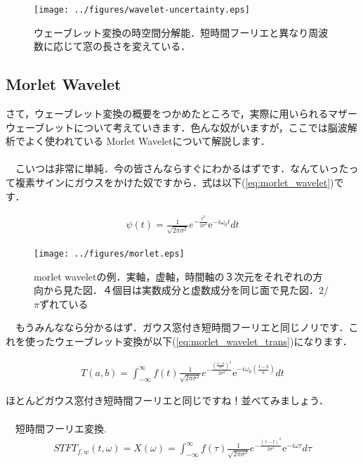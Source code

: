 \documentclass[11pt,a4paper]{ujreport} 	%
\begin{document}
\begin{figure}[H]
  \label{im:wavelet-uncertainty}
  \centering
  \texttt{[image: ../figures/wavelet-uncertainty.eps]}
  \caption{ウェーブレット変換の時空間分解能．短時間フーリエと異なり周波数に応じて窓の長さを変えている．}
\end{figure}

\subsection{Morlet Wavelet}
さて，ウェーブレット変換の概要をつかめたところで，実際に用いられるマザーウェーブレットについて考えていきます．色んな奴がいますが，ここでは脳波解析でよく使われている Morlet Waveletについて解説します．\\
\\
　こいつは非常に単純．今の皆さんならすぐにわかるはずです．なんていったって複素サインにガウスをかけた奴ですから．式は以下(\ref{eq:morlet_wavelet})です．

\begin{eqnarray}
\psi(t) = \frac{1}{\sqrt{2\pi\sigma^2}}e^{-\frac{t^2}{2\sigma^2}}\mathrm{e}^{-i\omega_0 t} dt
\label{eq:morlet_wavelet}
\end{eqnarray}

\begin{figure}[H]
  \centering
  \texttt{[image: ../figures/morlet.eps]}
  \caption{morlet waveletの例．実軸，虚軸，時間軸の３次元をそれぞれの方向から見た図．４個目は実数成分と虚数成分を同じ面で見た図．2/$\pi$ずれている}
\end{figure}

　もうみんななら分かるはず．ガウス窓付き短時間フーリエと同じノリです．これを使ったウェーブレット変換が以下(\ref{eq:morlet_wavelet_trans})になります．

\begin{eqnarray}
T(a,b) =  \int_{-\infty}^{\infty} f(t) \frac{1}{\sqrt{2\pi\sigma^2}}e^{-\frac{(\frac{t-b}{a})^2}{2\sigma^2}}\mathrm{e}^{-i\omega_0 (\frac{t-b}{a})} dt
\label{eq:morlet_wavelet_trans}
\end{eqnarray}

ほとんどガウス窓付き短時間フーリエと同じですね！並べてみましょう．
\\\\
　短時間フーリエ変換.
\begin{eqnarray}
  STFT_{f,w}(t, \omega) = X(\omega) = \int_{-\infty}^{\infty} f(\tau) \frac{1}{\sqrt{2\pi\sigma^2}}e^{-\frac{{(\tau-t)}^2}{2\sigma^2}}\mathrm{e}^{-i\omega \tau} d\tau
\end{eqnarray}
\end{document}
